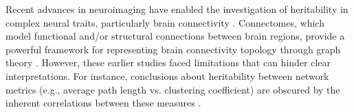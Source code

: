 Recent advances in neuroimaging have enabled the investigation of heritability in complex neural traits, particularly brain connectivity \cite{dmri_schizo1, dmri_schizo2, dmri_schizo_overview, dmri_heritability1,Sinclair2015-so}. 
Connectomes, which model functional and/or structural connections between brain regions, provide a powerful framework for representing brain connectivity topology through graph theory \cite{bullmore2009complex, galantucci2017structural, aerts2016brain}. 
However, these earlier studies faced limitations that can hinder clear interpretations. For instance, conclusions about heritability between network metrics (e.g., average path length vs. clustering coefficient) are obscured by the inherent correlations between these measures  \cite{chung2021statistical}.
